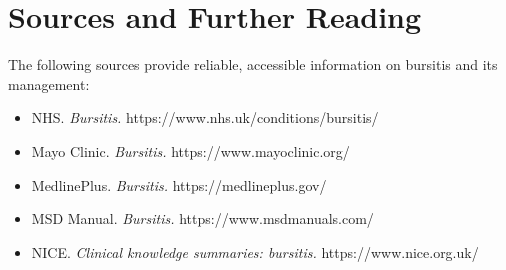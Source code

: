 \section*{Sources and Further Reading}
The following sources provide reliable, accessible information on bursitis and its management:
\begin{itemize}
    \item NHS. \textit{Bursitis.} https://www.nhs.uk/conditions/bursitis/
    \item Mayo Clinic. \textit{Bursitis.} https://www.mayoclinic.org/
    \item MedlinePlus. \textit{Bursitis.} https://medlineplus.gov/
    \item MSD Manual. \textit{Bursitis.} https://www.msdmanuals.com/
    \item NICE. \textit{Clinical knowledge summaries: bursitis.} https://www.nice.org.uk/
\end{itemize}
